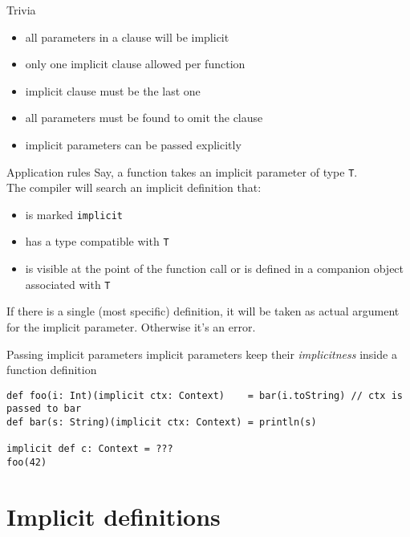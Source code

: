 \documentclass[aspectratio=169]{beamer}
\begin{document}
\begin{frame}{Trivia}
  \begin{itemize}
    \item all parameters in a clause will be implicit
    \item only one implicit clause allowed per function
    \item implicit clause must be the last one
    \item all parameters must be found to omit the clause
    \item implicit parameters can be passed explicitly
  \end{itemize}
\end{frame}

\begin{frame}{Application rules}
  Say, a function takes an implicit parameter of type \texttt{T}. \\
  The compiler will search an implicit definition that:
  \bigskip
  \begin{itemize}
    \item is marked \texttt{implicit}
    \item has a type compatible with \texttt{T}
    \item is visible at the point of the function call
      or is defined in a companion object associated with \texttt{T}
  \end{itemize}
  \bigskip
  If there is a single (most specific) definition, it will be taken as actual argument for the
  implicit parameter. Otherwise it's an error.
\end{frame}

\begin{frame}[fragile]{Passing implicit parameters}
\alert{implicit} parameters keep their \textit{implicitness} inside a function definition
\bigskip
\begin{verbatim}
def foo(i: Int)(implicit ctx: Context)    = bar(i.toString) // ctx is passed to bar
def bar(s: String)(implicit ctx: Context) = println(s)

implicit def c: Context = ???
foo(42)
\end{verbatim}
\end{frame}

\section{Implicit definitions}
\end{document}
